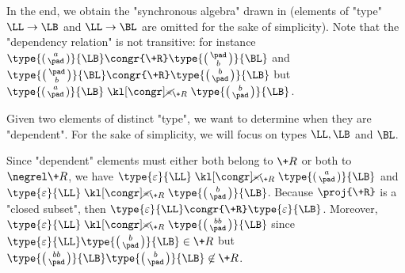 \begin{example}
	In the end, we obtain the "synchronous algebra" drawn in  (elements of "type" $\LL\to\LB$ and $\LL\to\BL$ are omitted for the sake of simplicity).
	Note that the "dependency relation" is not transitive:
	for instance $\type{\pair{a}{\pad}}{\LB} \congr{\+R} \type{\pair{\pad}{b}}{\BL}$
	and $\type{\pair{\pad}{b}}{\BL} \congr{\+R} \type{\pair{b}{\pad}}{\LB}$
	but $\type{\pair{a}{\pad}}{\LB} \notcongr{\+R} \type{\pair{b}{\pad}}{\LB}$.

Given two elements of distinct "type", we want to determine
when they are "dependent". For the sake of simplicity,
we will focus on types $\LL, \LB$ and $\BL$.

Since "dependent" elements must either both belong to $\+R$ or both to $\negrel\+R$,
we have $\type{\varepsilon}{\LL} \notcongr{\+R} \type{\pair{a}{\pad}}{\LB}$
and $\type{\varepsilon}{\LL} \notcongr{\+R} \type{\pair{b}{\pad}}{\LB}$.
Because $\proj{\+R}$ is a "closed subset",
then $\type{\varepsilon}{\LL} \congr{\+R} \type{\varepsilon}{\LB}$.
Moreover, $\type{\varepsilon}{\LL} \notcongr{\+R} \type{\pair{bb}{\pad}}{\LB}$ since
$\type{\varepsilon}{\LL} \type{\pair{b}{\pad}}{\LB} \in \+R$
but $\type{\pair{bb}{\pad}}{\LB} \type{\pair{b}{\pad}}{\LB} \not\in \+R$.


\end{example}
